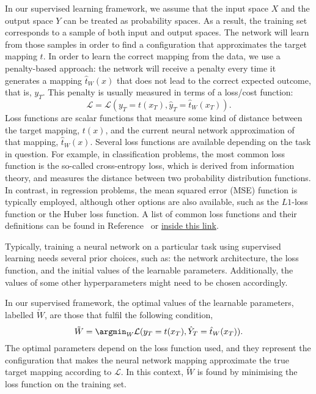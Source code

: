 In our supervised learning framework, we assume that the input space $X$ and the output space $Y$
can be treated as probability spaces. As a result, the training set corresponds to a sample of both
input and output spaces. The network will learn from those samples in order to find a configuration
that approximates the target mapping $t$. In order to learn the correct mapping from the data, we
use a penalty-based approach: the network will receive a penalty every time it generates a mapping
$\hat{t}_W(x)$ that does not lead to the correct expected outcome, that is, $y_T$. This penalty is
usually measured in terms of a loss/cost function:
\begin{equation} 
    \mathcal{L} = \mathcal{L}(y_T = t(x_T), \hat{y}_T = \hat{t}_W(x_T)).
\end{equation} 
Loss functions are scalar functions that measure some kind of distance between the target mapping,
$t(x)$, and the current neural network approximation of that mapping, $\hat{t}_W(x)$. Several loss
functions are available depending on the task in question. For example, in classification problems,
the most common loss function is the so-called cross-entropy loss, which is derived from information
theory, and measures the distance between two probability distribution functions. In contrast, in
regression problems, the mean squared error (MSE) function is typically employed, although other
options are also available, such as the $L1$-loss function or the Huber loss function. A list of
common loss functions and their definitions can be found in Reference~\cite{PyTorch} or
\href{https://pytorch.org/docs/stable/nn.html}{inside this link}.

Typically, training a neural network on a particular task using supervised learning needs several
prior choices, such as: the network architecture, the loss function, and the initial values of the
learnable parameters. Additionally, the values of some other hyperparameters might need to be chosen
accordingly. 

In our supervised framework, the optimal values of the learnable parameters, labelled $\tilde{W}$,
are those that fulfil the following condition,
\begin{equation}
    \tilde{W} = \argmin_{W} \mathcal{L}(y_T = t(x_T), \hat{Y}_T = \hat{t}_W(x_T)).
    \label{eq:neural_networks/argmin_eq}
\end{equation} 
The optimal parameters depend on the loss function used, and they represent the configuration that
makes the neural network mapping approximate the true target mapping according to $\mathcal{L}$. In
this context, $\tilde{W}$ is found by minimising the loss function on the training set.

